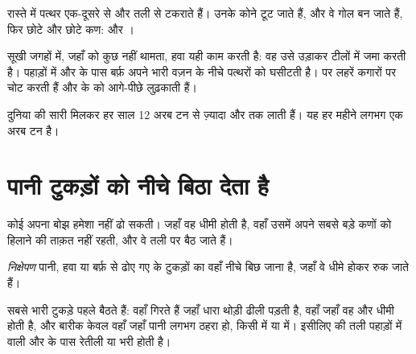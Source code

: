 रास्ते में पत्थर एक-दूसरे से और तली से टकराते हैं। उनके कोने टूट जाते हैं, और वे
गोल  बन जाते हैं, फिर छोटे और छोटे कण:  और
।

सूखी जगहों में, जहाँ  को कुछ नहीं थामता, हवा यही काम करती है: वह उसे उड़ाकर
टीलों में जमा करती है। पहाड़ों में और  के पास बर्फ़ अपने भारी वज़न के नीचे
पत्थरों को घसीटती है।  पर लहरें कगारों पर चोट करती हैं और   के 
को आगे-पीछे लुढ़काती हैं।

\begin{remark}[कितना?]\label{rem:g5:water-shapes-the-land:how-much}
दुनिया की सारी  मिलकर हर साल 12 अरब टन से ज़्यादा  और   तक
लाती हैं। यह हर महीने लगभग एक अरब टन
है।
\end{remark}

\section{पानी टुकड़ों को नीचे बिठा देता है}

कोई  अपना बोझ हमेशा नहीं ढो सकती। जहाँ वह धीमी होती है, वहाँ उसमें अपने सबसे
बड़े कणों को हिलाने की ताक़त नहीं रहती, और वे तली पर बैठ जाते हैं।

\begin{definition}[निक्षेपण]\label{def:g5:water-shapes-the-land:deposition}
\emph{निक्षेपण} पानी, हवा या बर्फ़ से ढोए गए  के टुकड़ों का
वहाँ नीचे बिछ जाना है, जहाँ वे धीमे होकर रुक जाते हैं।
\end{definition}

सबसे भारी टुकड़े पहले बैठते हैं:  वहाँ गिरते हैं जहाँ धारा थोड़ी ढीली पड़ती है,
 वहाँ जहाँ वह और धीमी होती है, और बारीक  केवल वहाँ जहाँ पानी लगभग
ठहरा हो, किसी  में या  में। इसीलिए  की तली पहाड़ों में  वाली
और  के पास रेतीली या  भरी होती है।

